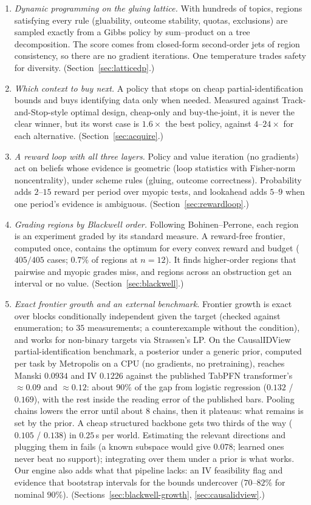 \documentclass[11pt]{article}
\theoremstyle{definition}
\theoremstyle{remark}
\newcommand{\bayesM}{0.0934}\newcommand{\bayesIV}{0.1226}\newcommand{\bayesCH}{16}\newcommand{\bayesWM}{31}\newcommand{\bayesWIV}{33}
\begin{document}
\begin{enumerate}
  \item \emph{Dynamic programming on the gluing lattice.} With hundreds of topics, regions satisfying every rule (gluability, outcome stability, quotas, exclusions) are sampled exactly from a Gibbs policy by sum--product on a tree decomposition. The score comes from closed-form second-order jets of region consistency, so there are no gradient iterations. One temperature trades safety for diversity. (Section~\ref{sec:latticedp}.)
  \item \emph{Which context to buy next.} A policy that stops on cheap partial-identification bounds and buys identifying data only when needed. Measured against Track-and-Stop-style optimal design, cheap-only and buy-the-joint, it is never the clear winner, but its worst case is $1.6\times$ the best policy, against $4$--$24\times$ for each alternative. (Section~\ref{sec:acquire}.)
  \item \emph{A reward loop with all three layers.} Policy and value iteration (no gradients) act on beliefs whose evidence is geometric (loop statistics with Fisher-norm noncentrality), under scheme rules (gluing, outcome correctness). Probability adds $2$--$15$ reward per period over myopic tests, and lookahead adds $5$--$9$ when one period's evidence is ambiguous. (Section~\ref{sec:rewardloop}.)
  \item \emph{Grading regions by Blackwell order.} Following Bohinen--Perrone, each region is an experiment graded by its standard measure. A reward-free frontier, computed once, contains the optimum for every convex reward and budget ($405/405$ cases; $0.7\%$ of regions at $n=12$). It finds higher-order regions that pairwise and myopic grades miss, and regions across an obstruction get an interval or no value. (Section~\ref{sec:blackwell}.)
  \item \emph{Exact frontier growth and an external benchmark.} Frontier growth is exact over blocks conditionally independent given the target (checked against enumeration; to $35$ measurements; a counterexample without the condition), and works for non-binary targets via Strassen's LP. On the CausalIDView partial-identification benchmark, a posterior under a generic prior, computed per task by Metropolis on a CPU (no gradients, no pretraining), reaches Manski $\bayesM$ and IV $\bayesIV$ against the published TabPFN transformer's $\approx0.09$ and $\approx0.12$: about $90\%$ of the gap from logistic regression ($0.132$ / $0.169$), with the rest inside the reading error of the published bars. Pooling chains lowers the error until about $8$ chains, then it plateaus: what remains is set by the prior. A cheap structured backbone gets two thirds of the way ($0.105$ / $0.138$) in $0.25$\,s per world. Estimating the relevant directions and plugging them in fails (a known subspace would give $0.078$; learned ones never beat no support); integrating over them under a prior is what works. Our engine also adds what that pipeline lacks: an IV feasibility flag and evidence that bootstrap intervals for the bounds undercover ($70$--$82\%$ for nominal $90\%$). (Sections~\ref{sec:blackwell-growth}, \ref{sec:causalidview}.)

\end{enumerate}
\end{document}
